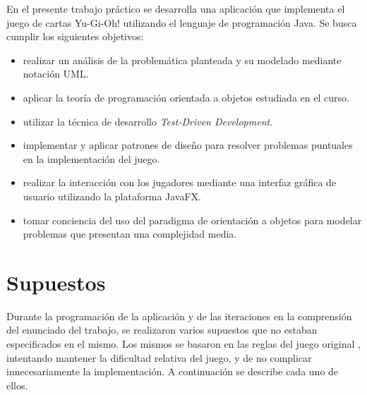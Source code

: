 En el presente trabajo práctico se desarrolla una aplicación que implementa el juego de cartas Yu-Gi-Oh! utilizando el lenguaje de programación Java. Se busca cumplir los siguientes objetivos:
\begin{itemize}
	\item realizar un análisis de la problemática planteada y su modelado mediante notación UML.
	\item aplicar la teoría de programación orientada a objetos estudiada en el curso.
	\item utilizar la técnica de desarrollo \emph{Test-Driven Development}.
	\item implementar y aplicar patrones de diseño para resolver problemas puntuales en la implementación del juego.
	\item realizar la interacción con los jugadores mediante una interfaz gráfica de usuario utilizando la plataforma JavaFX.
	\item tomar conciencia del uso del paradigma de orientación a objetos para modelar problemas que presentan una complejidad media.
\end{itemize}

\section{Supuestos}

Durante la programación de la aplicación y de las iteraciones en la comprensión del enunciado del trabajo, se realizaron varios supuestos que no estaban especificados en el mismo. Los mismos se basaron en las reglas del juego original \cite{reglas_juego}, intentando mantener la dificultad relativa del juego, y de no complicar innecesariamente la implementación. A continuación se describe cada uno de ellos.

